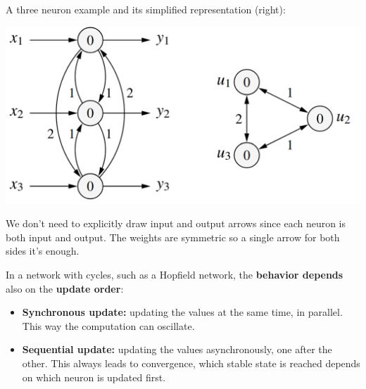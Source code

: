 A three neuron example and its simplified representation (right):
\begin{center}
	\includegraphics[width=0.8\columnwidth]{img/NN/HN2}
\end{center}
We don't need to explicitly draw input and output arrows since each neuron is both input and output. The weights are symmetric so a single arrow for both sides it's enough.\\

\newpage

In a network with cycles, such as a Hopfield network, the \textbf{behavior depends} also on the \textbf{update order}:
\begin{itemize}
	\item \textbf{Synchronous update:} updating the values at the same time, in parallel. This way the computation can oscillate.\\
	
	\item \textbf{Sequential update:} updating the values asynchronously, one after the other. This always leads to convergence, which stable state is reached depends on which neuron is updated first.\\
\end{itemize}

